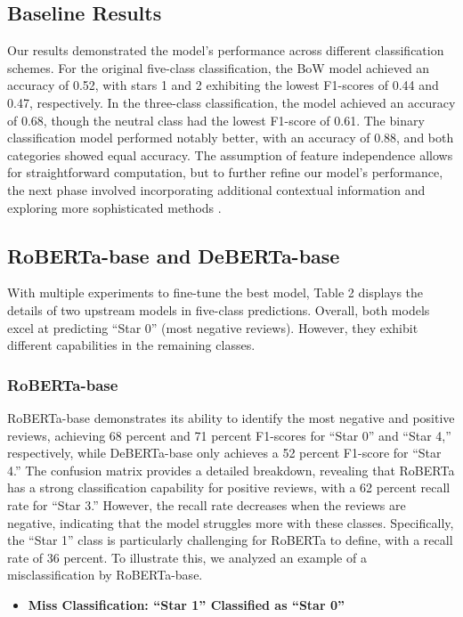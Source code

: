 \documentclass[12pt]{article}
\begin{document}
\subsection{Baseline Results}
Our results demonstrated the model’s performance across different classification schemes. For the original five-class classification, the BoW model achieved an accuracy of 0.52, with stars 1 and 2 exhibiting the lowest F1-scores of 0.44 and 0.47, respectively. In the three-class classification, the model achieved an accuracy of 0.68, though the neutral class had the lowest F1-score of 0.61. The binary classification model performed notably better, with an accuracy of 0.88, and both categories showed equal accuracy. The assumption of feature independence allows for straightforward computation, but to further refine our model's performance, the next phase involved incorporating additional contextual information and exploring more sophisticated methods \citep{rish2001empirical}.

\subsection{RoBERTa-base and DeBERTa-base}
With multiple experiments to fine-tune the best model, Table 2 displays the details of two upstream models in five-class predictions. Overall, both models excel at predicting “Star 0” (most negative reviews). However, they exhibit different capabilities in the remaining classes.

\subsubsection{RoBERTa-base}
RoBERTa-base demonstrates its ability to identify the most negative and positive reviews, achieving 68 percent and 71 percent F1-scores for “Star 0” and “Star 4,” respectively, while DeBERTa-base only achieves a 52 percent F1-score for “Star 4.” The confusion matrix provides a detailed breakdown, revealing that RoBERTa has a strong classification capability for positive reviews, with a 62 percent recall rate for “Star 3.” However, the recall rate decreases when the reviews are negative, indicating that the model struggles more with these classes. Specifically, the “Star 1” class is particularly challenging for RoBERTa to define, with a recall rate of 36 percent. To illustrate this, we analyzed an example of a misclassification by RoBERTa-base.

\begin{itemize}
  \item \textbf{Miss Classification: ``Star 1'' Classified as ``Star 0''}
\end{itemize}
\end{document}
